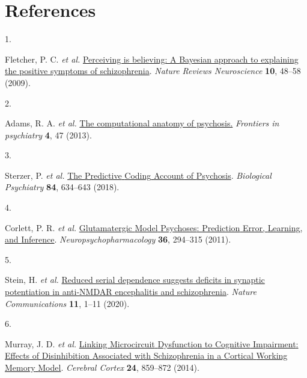 \documentclass[
]{article}
\newlength{\cslhangindent}
\newlength{\csllabelwidth}
\newlength{\cslentryspacingunit} %
\newenvironment{CSLReferences}[2] %
 {%
  \setlength{\parindent}{0pt}
  \ifodd #1
  \let\oldpar\par
  \def\par{\hangindent=\cslhangindent\oldpar}
  \fi
  \setlength{\parskip}{#2\cslentryspacingunit}
 }%
 {}
\newcommand{\CSLLeftMargin}[1]{\parbox[t]{\csllabelwidth}{#1}}
\newcommand{\CSLRightInline}[1]{\parbox[t]{\linewidth - \csllabelwidth}{#1}\break}
\begin{document}
\newpage

\hypertarget{references}{%
\section*{References}\label{references}}

\hypertarget{refs}{}
\begin{CSLReferences}{0}{0}
\leavevmode{}%
\CSLLeftMargin{1. }%
\CSLRightInline{Fletcher, P. C. \emph{et al.}
\href{https://doi.org/10.1038/nrn2536}{Perceiving is believing: A
{Bayesian} approach to explaining the positive symptoms of
schizophrenia}. \emph{Nature Reviews Neuroscience} \textbf{10}, 48--58
(2009).}

\leavevmode{}%
\CSLLeftMargin{2. }%
\CSLRightInline{Adams, R. A. \emph{et al.}
\href{https://doi.org/10.3389/fpsyt.2013.00047}{The computational
anatomy of psychosis.} \emph{Frontiers in psychiatry} \textbf{4}, 47
(2013).}

\leavevmode{}%
\CSLLeftMargin{3. }%
\CSLRightInline{Sterzer, P. \emph{et al.}
\href{https://doi.org/10.1016/j.biopsych.2018.05.015}{The {Predictive}
{Coding} {Account} of {Psychosis}}. \emph{Biological Psychiatry}
\textbf{84}, 634--643 (2018).}

\leavevmode{}%
\CSLLeftMargin{4. }%
\CSLRightInline{Corlett, P. R. \emph{et al.}
\href{https://doi.org/10.1038/npp.2010.163}{Glutamatergic {Model}
{Psychoses}: {Prediction} {Error}, {Learning}, and {Inference}}.
\emph{Neuropsychopharmacology} \textbf{36}, 294--315 (2011).}

\leavevmode{}%
\CSLLeftMargin{5. }%
\CSLRightInline{Stein, H. \emph{et al.}
\href{https://doi.org/10.1038/s41467-020-18033-3}{Reduced serial
dependence suggests deficits in synaptic potentiation in anti-{NMDAR}
encephalitis and schizophrenia}. \emph{Nature Communications}
\textbf{11}, 1--11 (2020).}

\leavevmode{}%
\CSLLeftMargin{6. }%
\CSLRightInline{Murray, J. D. \emph{et al.}
\href{https://doi.org/10.1093/cercor/bhs370}{Linking {Microcircuit}
{Dysfunction} to {Cognitive} {Impairment}: {Effects} of {Disinhibition}
{Associated} with {Schizophrenia} in a {Cortical} {Working} {Memory}
{Model}}. \emph{Cerebral Cortex} \textbf{24}, 859--872 (2014).}


\end{CSLReferences}
\end{document}
